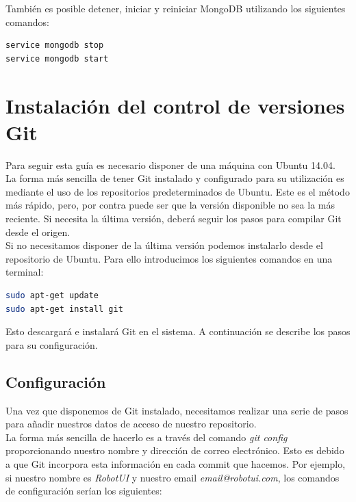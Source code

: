 También es posible detener, iniciar y reiniciar MongoDB utilizando los siguientes comandos:\\

\begin{lstlisting}[language=bash]
service mongodb stop
service mongodb start
\end{lstlisting}


\section{Instalación del control de versiones Git}

Para seguir esta guía es necesario disponer de una máquina con Ubuntu 14.04.\\

La forma más sencilla de tener Git instalado y configurado para su utilización es mediante el uso de los repositorios predeterminados de Ubuntu. 
Este es el método más rápido, pero, por contra puede ser que la versión disponible no sea la más reciente. 
Si necesita la última versión, deberá seguir los pasos para compilar Git desde el origen.\\

Si no necesitamos disponer de la última versión podemos instalarlo desde el repositorio de Ubuntu. Para ello introducimos los siguientes comandos en una terminal:\\

\begin{lstlisting}[language=bash]
sudo apt-get update
sudo apt-get install git
\end{lstlisting}

Esto descargará e instalará Git en el sistema. A continuación se describe los pasos para su configuración.

\subsection{Configuración}

Una vez que disponemos de Git instalado, necesitamos realizar una serie de pasos para añadir nuestros datos de acceso de nuestro repositorio.\\

La forma más sencilla de hacerlo es a través del comando \emph{git config} proporcionando nuestro nombre y dirección de correo electrónico. Esto es debido a que Git incorpora esta información en cada commit
que hacemos. Por ejemplo, si nuestro nombre es \emph{RobotUI} y nuestro email \emph{email@robotui.com}, los comandos de configuración serían los siguientes:\\

